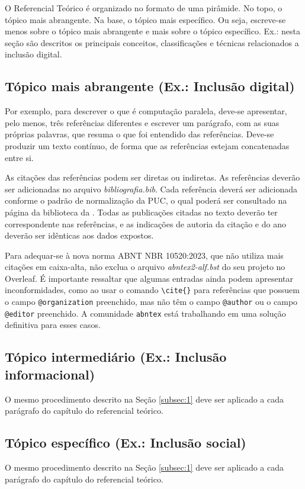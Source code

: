 O Referencial Teórico é organizado no formato de uma pirâmide. No topo, o tópico mais abrangente. Na base, o tópico mais específico. Ou seja, escreve-se menos sobre o tópico mais abrangente e mais sobre o tópico específico. Ex.: nesta seção são descritos os principais conceitos, classificações e técnicas relacionados a inclusão digital. 

\estrutura\subsection{\esp Tópico mais abrangente (Ex.: Inclusão digital)}\instrucao 
\label{subsec:1}
Por exemplo, para descrever o que é computação paralela, deve-se apresentar, pelo menos, três referências diferentes e escrever um parágrafo, com as suas próprias palavras, que resuma o que foi entendido das referências. Deve-se produzir um texto contínuo, de forma que as referências estejam concatenadas entre si.

As citações das referências podem ser diretas ou indiretas. As referências deverão ser adicionadas no arquivo \textit{bibliografia.bib}. Cada referência deverá ser adicionada conforme o padrão de normalização da PUC, 
o qual poderá ser consultado na página da biblioteca da . Todas as publicações citadas no texto deverão ter correspondente nas referências, 
e as indicações de autoria da citação e do ano deverão ser idênticas aos dados expostos. 

Para adequar-se à nova norma ABNT NBR 10520:2023, que não utiliza mais citações em caixa-alta, não exclua o arquivo \textit{abntex2-alf.bst} do seu projeto no Overleaf. É importante ressaltar que algumas entradas ainda podem apresentar inconformidades, como ao usar o comando \verb|\cite{}| para referências que possuem o campo \verb|@organization| preenchido, mas não têm o campo \verb|@author| ou o campo \verb|@editor| preenchido. A comunidade \texttt{abntex} está trabalhando em uma solução definitiva para esses casos. 

\estrutura\subsection{\esp Tópico intermediário (Ex.: Inclusão informacional) }\instrucao
O mesmo procedimento descrito na Seção \ref{subsec:1} deve ser aplicado a cada parágrafo do capítulo do referencial teórico.

\estrutura\subsection{\esp Tópico específico (Ex.: Inclusão social) }\instrucao
O mesmo procedimento descrito na Seção \ref{subsec:1} deve ser aplicado a cada parágrafo do capítulo do referencial teórico.




